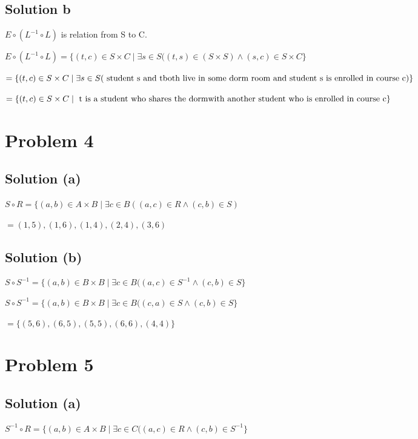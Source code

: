 \documentclass{article}
\begin{document}
\subsection{Solution b}
\noindent

$E \circ (L^{-1} \circ L)$ is relation from S to C.

$E \circ (L^{-1} \circ L) = \{(t,c) \in S \times C \mid \exists s \in
S((t,s) \in (S \times S) \land (s,c) \in S \times C\}$

\begin{multiline}
$=\{(t,c) \in S \times C \mid \exists s \in S(\text{ student s and t \\
  both live in some dorm room and student s is enrolled in course c})\}$
\end{multiline}

$=\{(t,c) \in S \times C \mid \text{ t is a student who shares the
    dorm \\ with another student who is enrolled in course c}\}$

\section{Problem 4}

\subsection{Solution (a)}
\noindent

$S \circ R = \{(a,b) \in A \times B \mid \exists c \in B((a,c) \in R
\land (c,b) \in S)$

$ = {(1,5), (1,6), (1,4), (2,4), (3,6)}$

\subsection{Solution (b)}
\noindent

$S \circ S^{- 1} = \{(a,b) \in B \times B \mid \exists c \in B((a,c)
\in S^{-1} \land (c,b) \in S\}$

$S \circ S^{- 1} = \{(a,b) \in B \times B \mid \exists c \in B((c,a)
\in S \land (c,b) \in S\}$

$ = \{(5,6),(6,5),(5,5),(6,6),(4,4)\}$

\section{Problem 5}

\subsection{Solution (a)}
\noindent
$S^{-1} \circ R = \{(a,b) \in A \times B \mid \exists c \in C((a,c)
\in R \land (c,b) \in S^{-1}\}$
\end{document}
